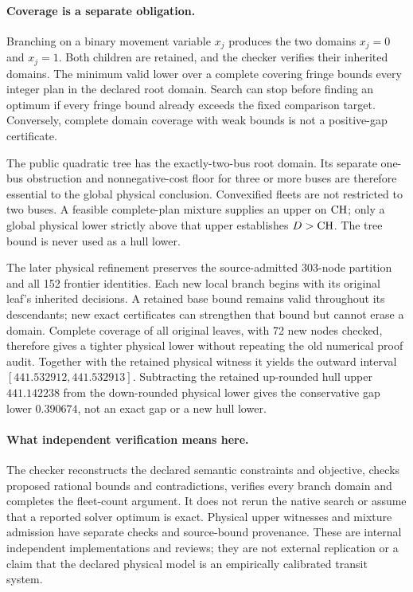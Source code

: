 \paragraph{Coverage is a separate obligation.}
Branching on a binary movement variable $x_j$ produces the two domains
$x_j=0$ and $x_j=1$. Both children are retained, and the checker verifies
their inherited domains. The minimum valid lower over a complete covering
fringe bounds every integer plan in the declared root domain. Search can
stop before finding an optimum if every fringe bound already exceeds the
fixed comparison target. Conversely, complete domain coverage with weak
bounds is not a positive-gap certificate.

The public quadratic tree has the exactly-two-bus root domain. Its separate
one-bus obstruction and nonnegative-cost floor for three or more buses are
therefore essential to the global physical conclusion. Convexified fleets
are not restricted to two buses. A feasible complete-plan mixture supplies
an upper on $\mathrm{CH}$; only a global physical lower strictly above that upper
establishes $D>\mathrm{CH}$. The tree bound is never used as a hull lower.

The later physical refinement preserves the source-admitted 303-node
partition and all 152 frontier identities. Each new local branch begins
with its original leaf's inherited decisions. A retained base bound remains
valid throughout its descendants; new exact certificates can strengthen
that bound but cannot erase a domain. Complete coverage of all original
leaves, with 72 new nodes checked, therefore gives a tighter physical
lower without repeating the old numerical proof audit. Together with the
retained physical witness it yields the outward interval
$[441.532912,441.532913]$. Subtracting the retained up-rounded hull upper
$441.142238$ from the down-rounded physical lower gives the conservative
gap lower $0.390674$, not an exact gap or a new hull lower.

\paragraph{What independent verification means here.}
The checker reconstructs the declared semantic constraints and objective,
checks proposed rational bounds and contradictions, verifies every branch
domain and completes the fleet-count argument. It does not rerun the native
search or assume that a reported solver optimum is exact. Physical upper
witnesses and mixture admission have separate checks and source-bound
provenance. These are internal independent implementations and reviews;
they are not external replication or a claim that the declared physical
model is an empirically calibrated transit system.

